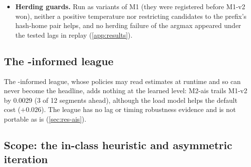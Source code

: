 \begin{itemize}
    mixed prefill and decode passes, which act on M1-v2's concentration mechanism, keep the lead
    between $+0.0268$ and $+0.0291$ against $+0.0290$; they bracket fidelity errors, are not
    measurements of reality and do not cover FAST25, a test-only family (\cref{app:results}).
  \item \textbf{Herding guards.} Run as variants of M1 (they were registered before M1-v2 won),
    neither a positive temperature nor restricting candidates to the prefix's hash-home pair helps,
    and no herding failure of the argmax appeared under the tested lags in replay
    (\cref{app:results}).
\end{itemize}

\subsection{The \ais{}-informed league}
\label{sec:res-ais-summary}

The \ais{}-informed league, whose policies may read \ais{} estimates at runtime and so can never
become the headline, adds nothing at the learned level: M2-ais trails M1-v2 by 0.0029 (3 of 12 segments ahead),
although the \ais{} load model helps the default cost ($+0.026$). The league has no lag or timing
robustness evidence and is not portable as is (\cref{sec:res-ais}).

\subsection{Scope: the in-class heuristic and asymmetric iteration}
\label{sec:res-fairness}

